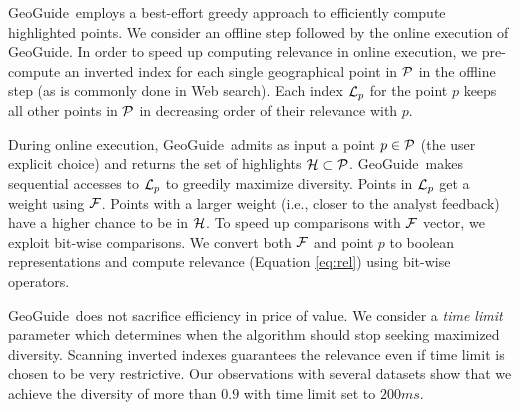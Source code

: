 \documentclass{vldb}
\newtheorem{problem}{Problem}
\newcommand{\framework}{{\sc GeoGuide}}
\newcommand{\pb}{{\sc GeoGuide}}
\begin{document}



\framework\ employs a best-effort greedy approach to efficiently compute highlighted points. We consider an offline step followed by the online execution of \framework.
In order to speed up computing relevance in online execution, we pre-compute an inverted index for each single geographical point in ${\cal P}$ in the offline step (as is commonly done in Web search). Each index ${\cal L}_p$ for the point $p$ keeps all other points in ${\cal P}$ in decreasing order of their relevance with $p$.

During online execution, \framework\ admits as input a point $p \in {\cal P}$ (the user explicit choice) and returns the set of highlights ${\cal H} \subset {\cal P}$. \framework\ makes sequential accesses to ${\cal L}_p$ to greedily maximize diversity. Points in ${\cal L}_p$ get a weight using ${\cal F}$. Points with a larger weight (i.e., closer to the analyst feedback) have a higher chance to be in ${\cal H}$. To speed up comparisons with ${\cal F}$ vector, we exploit bit-wise comparisons. We convert both ${\cal F}$ and point $p$ to boolean representations and compute relevance (Equation \ref{eq:rel}) using bit-wise operators.

\framework\ does not sacrifice efficiency in price of value. We consider a {\em time limit} parameter which determines when the algorithm should stop seeking maximized diversity. Scanning inverted indexes guarantees the relevance even if time limit is chosen to be very restrictive. Our observations with several datasets show that we achieve the diversity of more than $0.9$ with time limit set to $200ms$.
\end{document}
